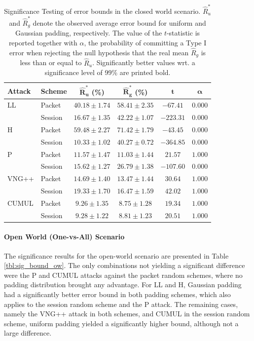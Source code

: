 \documentclass[
	ruledheaders=chapter,
	class=report,
	thesis={type=master, department=inf},
	accentcolor=1c,
	custommargins=true,
	marginpar=false,
	parskip=half-,
	fontsize=11pt,
]{tudapub}
\begin{document}
	\begin{table}
		\centering
		\small
		\begin{tabular}{llcccc}
			\toprule \textbf{Attack} & \textbf{Scheme} & $\mathbf{\widehat{R}^*_u}$ \textbf{(\%)} & $\mathbf{\widehat{R}^*_g}$  \textbf{(\%)} & $\mathbf{t}$ & $\mathbf{\alpha}$ \\
			\midrule LL & Packet & $40.18 \pm 1.74$ & $\mathbf{58.41 \pm 2.35}$ & $-67.41$ & $0.000$\\
			& Session & $16.67 \pm 1.35$ & $\mathbf{42.22 \pm 1.07}$ & $-223.31$ &  $0.000$\\ \addlinespace
			H & Packet & $59.48 \pm 2.27$ & $\mathbf{71.42 \pm 1.79}$ & $-43.45$ & $0.000$ \\
			& Session & $10.33 \pm 1.02$ & $\mathbf{40.27 \pm 0.72}$ & $-364.85$ & $0.000$ \\ \addlinespace
			P & Packet & $\mathbf{11.57 \pm 1.47}$ & $11.03 \pm 1.44$ & $21.57$ & $1.000$ \\
			& Session & $15.62 \pm 1.27$ & $\mathbf{26.79 \pm 1.38}$ & $-107.60$ & $0.000$ \\ \addlinespace
			VNG++ & Packet & $\mathbf{14.69 \pm 1.40}$ & $13.47 \pm 1.44$ & $30.64$ & $1.000$ \\
			& Session & $\mathbf{19.33 \pm 1.70}$ & $16.47 \pm 1.59$ & $42.02$ & $1.000$ \\ \addlinespace
			CUMUL & Packet & $\mathbf{9.26 \pm 1.35}$ & $8.75 \pm 1.28$ & $19.34$ & $1.000$\\
			& Session & $\mathbf{9.28 \pm 1.22}$ & $8.81 \pm 1.23$ & $20.51$ & $1.000$ \\
			\bottomrule
		\end{tabular}
		\caption[Significance Testing of error bounds in the closed world scenario]{Significance Testing of error bounds in the closed world scenario. $\widehat{R}^*_u$ and $\widehat{R}^*_g$ denote the observed average error bound for uniform and Gaussian padding, respectively. The value of the $t$-statistic is reported together with $\alpha$, the probability of committing a Type I error when rejecting the null hypothesis that the real mean $\widehat{R}_g$ is less than or equal to $\widehat{R}_u$. Significantly better values wrt. a significance level of 99\% are printed bold. }
		\label{tbl:sig_bound_cw}
	\end{table}

	\paragraph{Open World (One-vs-All) Scenario} The significance results for the open-world scenario are presented in Table \ref{tbl:sig_bound_ow}. The only combinations not yielding a significant difference were the P and CUMUL attacks against the packet random schemes, where no padding distribution brought any advantage. For LL and H, Gaussian padding had a significantly better error bound in both padding schemes, which also applies to the session random scheme and the P attack. The remaining cases, namely the VNG++ attack in both schemes, and CUMUL in the session random scheme, uniform padding yielded a significantly higher bound, although not a large difference.
	
\end{document}
